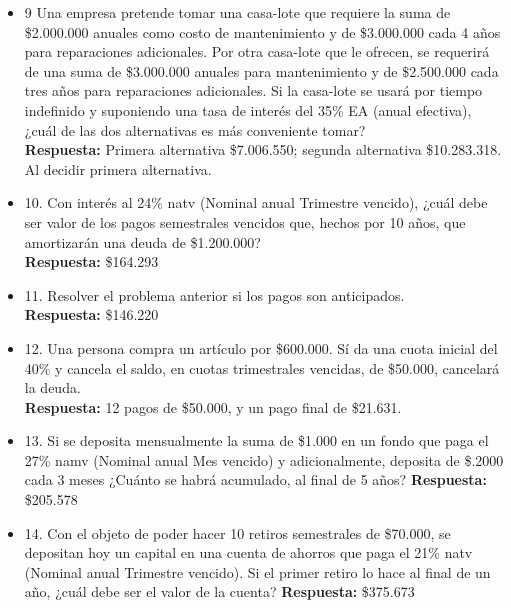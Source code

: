 \begin{itemize}
	\item 9 Una empresa pretende tomar una casa-lote que requiere la suma de \$2.000.000 anuales como costo de mantenimiento y de \$3.000.000 cada 4 años para reparaciones adicionales. Por otra casa-lote que le ofrecen, se requerirá de una suma de \$3.000.000 anuales para mantenimiento y de \$2.500.000 cada tres años para reparaciones adicionales. Si la casa-lote se usará por tiempo indefinido y suponiendo una tasa de interés del 35\% EA (anual efectiva), ¿cuál de las dos alternativas es más conveniente tomar?\\
	      \textbf{Respuesta:} Primera alternativa \$7.006.550; segunda alternativa \$10.283.318. Al decidir primera alternativa.\\
	      \medskip
	      
	\item 10. Con interés al 24\%  natv (Nominal anual Trimestre vencido), ¿cuál debe ser valor de los pagos semestrales vencidos que, hechos por 10 años, que amortizarán una deuda de \$1.200.000?\\
	      \textbf{Respuesta:} \$164.293
	      \medskip
	      
	\item 11. Resolver el problema anterior si los pagos son anticipados.\\
	      \textbf{Respuesta:} \$146.220\\
	      \medskip
	      
	\item 12. Una persona compra un artículo por \$600.000. Sí da una cuota inicial del 40\% y cancela el saldo, en cuotas trimestrales vencidas, de \$50.000, cancelará la deuda.\\
	      \textbf{Respuesta:} 12 pagos de \$50.000, y un pago final de \$21.631.\\
	      \medskip
	      
	\item 13. Si se deposita mensualmente la suma de \$1.000 en un fondo que paga el 27\%  namv (Nominal anual Mes vencido) y adicionalmente, deposita de \$.2000 cada 3 meses ¿Cuánto se habrá acumulado, al final de 5 años?
	      \textbf{Respuesta:} \$205.578
	      \medskip
	      
	\item 14. Con  el objeto de poder hacer 10 retiros semestrales de \$70.000, se depositan hoy un capital en una cuenta de ahorros que paga el 21\%  natv (Nominal anual Trimestre vencido). Si el primer retiro lo hace al final de un año, ¿cuál debe ser el valor de la cuenta?
	      \textbf{Respuesta:} \$375.673\\
	      \medskip
	      

\end{itemize}
